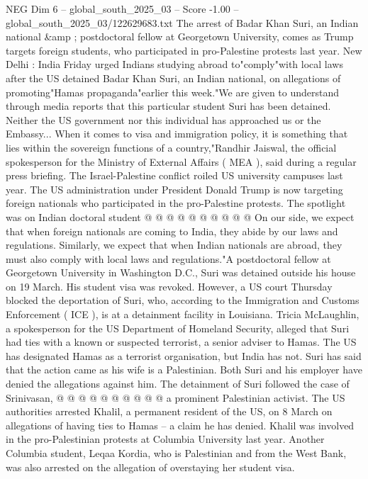 \begin{textsample}{NEG Dim 6 – global\_south\_2025\_03 – Score -1.00 – global\_south\_2025\_03/122629683.txt}  \label{ex:f6_neg_139}
The arrest of Badar Khan Suri, an Indian national \&amp ; postdoctoral fellow at Georgetown University, comes as Trump targets foreign students, who participated in pro-Palestine protests last year.
New Delhi : India Friday urged Indians studying abroad to"comply"with local laws after the US detained Badar Khan Suri, an Indian national, on allegations of promoting"Hamas propaganda"earlier this week."We are given to understand through media reports that this particular student Suri has been detained.
Neither the US government nor this individual has approached us or the Embassy...
When it comes to visa and immigration policy, it is something that lies within the sovereign functions of a country,"Randhir Jaiswal, the official spokesperson for the Ministry of External Affairs ( MEA ), said during a regular press briefing.
The Israel-Palestine conflict roiled US university campuses last year.
The US administration under President Donald Trump is now targeting foreign nationals who participated in the pro-Palestine protests.
The spotlight was on Indian doctoral student @ @ @ @ @ @ @ @ @ @ On our side, we expect that when foreign nationals are coming to India, they abide by our laws and regulations.
Similarly, we expect that when Indian nationals are abroad, they must also comply with local laws and regulations."A postdoctoral fellow at Georgetown University in Washington D.C., Suri was detained outside his house on 19 March.
His student visa was revoked.
However, a US court Thursday blocked the deportation of Suri, who, according to the Immigration and Customs Enforcement ( ICE ), is at a detainment facility in Louisiana.
Tricia McLaughlin, a spokesperson for the US Department of Homeland Security, alleged that Suri had ties with a known or suspected terrorist, a senior adviser to Hamas.
The US has designated Hamas as a terrorist organisation, but India has not.
Suri has said that the action came as his wife is a Palestinian.
Both Suri and his employer have denied the allegations against him.
The detainment of Suri followed the case of Srinivasan, @ @ @ @ @ @ @ @ @ @ a prominent Palestinian activist.
The US authorities arrested Khalil, a permanent resident of the US, on 8 March on allegations of having ties to Hamas -- a claim he has denied.
Khalil was involved in the pro-Palestinian protests at Columbia University last year.
Another Columbia student, Leqaa Kordia, who is Palestinian and from the West Bank, was also arrested on the allegation of overstaying her student visa.

\end{textsample}
